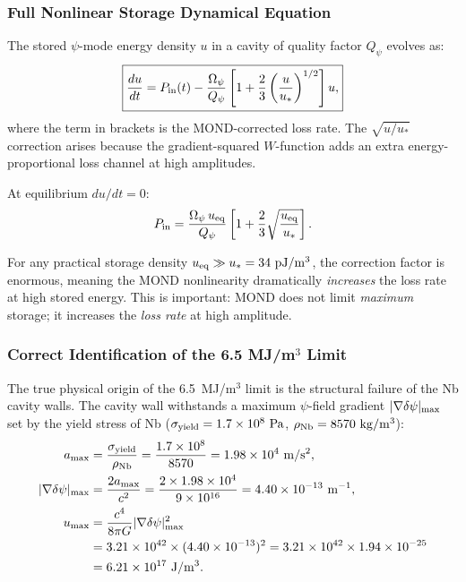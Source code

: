 \documentclass[aps,prd,twocolumn,superscriptaddress]{revtex4-2}
\newcommand{\Qpsi}{Q_\psi}
\newcommand{\Opsi}{\Omega_\psi}
\newcommand{\deltapsi}{\delta\psi}
\begin{document}
\subsubsection{Full Nonlinear Storage Dynamical Equation}

The stored $\psi$-mode energy density $u$ in a cavity of quality factor
$\Qpsi$ evolves as:
\begin{equation}
\boxed{
\frac{du}{dt} = P_{\rm in}(t)
- \frac{\Opsi}{\Qpsi}\left[1 + \frac{2}{3}\left(\frac{u}{u_*}\right)^{1/2}\right]u,
}
\end{equation}
where the term in brackets is the MOND-corrected loss rate.  The
$\sqrt{u/u_*}$ correction arises because the gradient-squared $W$-function
adds an extra energy-proportional loss channel at high amplitudes.

At equilibrium $du/dt = 0$:
\begin{equation}
P_{\rm in} = \frac{\Opsi\,u_{\rm eq}}{\Qpsi}
\left[1 + \frac{2}{3}\sqrt{\frac{u_{\rm eq}}{u_*}}\right].
\end{equation}

For any practical storage density $u_{\rm eq} \gg u_* = 34~\mathrm{pJ/m^3}$,
the correction factor is enormous, meaning the MOND nonlinearity
dramatically \emph{increases} the loss rate at high stored energy.
This is important: MOND does not limit \emph{maximum} storage; it
increases the \emph{loss rate} at high amplitude.

\subsubsection{Correct Identification of the 6.5 MJ/m$^3$ Limit}

The true physical origin of the 6.5~MJ/m$^3$ limit is the structural
failure of the Nb cavity walls.  The cavity wall withstands a maximum
$\psi$-field gradient $|\nabla\deltapsi|_{\rm max}$ set by the yield
stress of Nb ($\sigma_{\rm yield} = 1.7\times 10^8~\mathrm{Pa}$,
$\rho_{\rm Nb} = 8570~\mathrm{kg/m^3}$):
\begin{align}
a_{\rm max} &= \frac{\sigma_{\rm yield}}{\rho_{\rm Nb}}
= \frac{1.7\times 10^8}{8570} = 1.98\times 10^4~\mathrm{m/s^2}, \\
|\nabla\deltapsi|_{\rm max} &= \frac{2a_{\rm max}}{c^2}
= \frac{2\times 1.98\times 10^4}{9\times 10^{16}}
= 4.40\times 10^{-13}~\mathrm{m^{-1}}, \\
u_{\rm max} &= \frac{c^4}{8\pi G}|\nabla\deltapsi|_{\rm max}^2 \notag\\
&= 3.21\times 10^{42}\times(4.40\times 10^{-13})^2
= 3.21\times 10^{42}\times 1.94\times 10^{-25} \notag\\
&= 6.21\times 10^{17}~\mathrm{J/m^3}.
\end{align}
\end{document}
